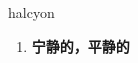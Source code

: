 
\begin{frame}
{\huge halcyon}
\begin{center}
\begin{enumerate}\Large
  \item \textbf{宁静的，平静的}
\end{enumerate}
\end{center}
\end{frame}

